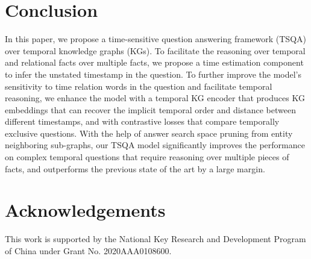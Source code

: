\documentclass[11pt]{article}
\begin{document}
\begin{comment}
we prepare a set of pre-defined temporal relation types and map each question to one of the types. For example, the type for ``what happened before" is mapped to the type ``before".
We use temporal keywords, such as the ``before", ``after", ``while", to define six temporal types. 
In Table \ref{ablation_test}, we observe that the performance of this setting is significantly worse than our OTR-QA model.
By using ``open'' relation extraction without pre-defined relation types, our OTR-QA model is much better in learning the variations and subtleties of temporal relations from limited textual descriptions.





Unicode cannot be used in Bib\TeX{} entries, and some ways of typing special characters can disrupt Bib\TeX's alphabetization. The recommended way of typing special characters is shown in Table~\ref{tab:accents}.

Please ensure that Bib\TeX{} records contain DOIs or URLs when possible, and for all the ACL materials that you reference.
Use the \verb|doi| field for DOIs and the \verb|url| field for URLs.
If a Bib\TeX{} entry has a URL or DOI field, the paper title in the references section will appear as a hyperlink to the paper, using the hyperref \LaTeX{} package.
\end{comment}

\section{Conclusion}
\label{sec:bibtex}

In this paper, we propose a time-sensitive question answering framework (TSQA) over temporal knowledge graphs (KGs). To facilitate the reasoning over temporal and relational facts over multiple facts, we propose a time estimation component to infer the unstated timestamp in the question. To further improve the model's sensitivity to time relation words in the question and facilitate temporal reasoning, we enhance the model with a temporal KG encoder that produces KG embeddings that can recover the implicit temporal order and distance between different timestamps, and with contrastive losses that compare temporally exclusive questions. With the help of answer search space pruning from entity neighboring sub-graphs, our TSQA model significantly improves the performance on complex temporal questions that require reasoning over multiple pieces of facts, and outperforms the previous state of the art by a large margin.







\section*{Acknowledgements}
This work is supported by the National Key Research and Development Program of China under Grant No. 2020AAA0108600.






\end{document}
